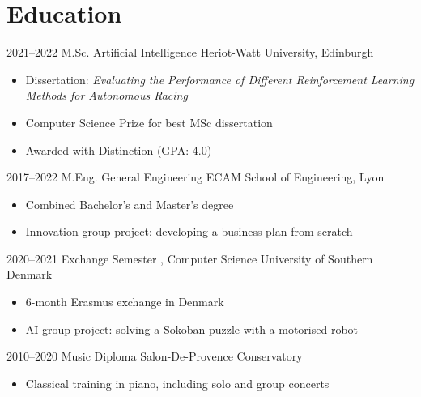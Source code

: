 
\section{Education}

\begin{entrylist}


\entry
{2021--2022}
{M.Sc. {\normalfont Artificial Intelligence}}
{Heriot-Watt University, Edinburgh}
{\begin{itemize} 
\item Dissertation: \emph{Evaluating the Performance of Different Reinforcement Learning Methods for Autonomous Racing} 
\item Computer Science Prize for best MSc dissertation
\item Awarded with Distinction (GPA: 4.0)\end{itemize}}

\entry
{2017--2022}
{M.Eng. {\normalfont General Engineering}}
{ECAM School of Engineering, Lyon}
{\begin{itemize} \item Combined Bachelor's and Master's degree \item Innovation group project: developing a business plan from scratch \end{itemize}}

\entry
{2020--2021}
{Exchange Semester {\normalfont , Computer Science}}
{University of Southern Denmark}
{\begin{itemize} \item 6-month Erasmus exchange in Denmark \item AI group project: solving a Sokoban puzzle with a motorised robot \end{itemize}}

\entry
{2010--2020}
{Music Diploma}
{Salon-De-Provence Conservatory}
{\begin{itemize} \item Classical training in piano, including solo and group concerts \end{itemize}}

\end{entrylist}
